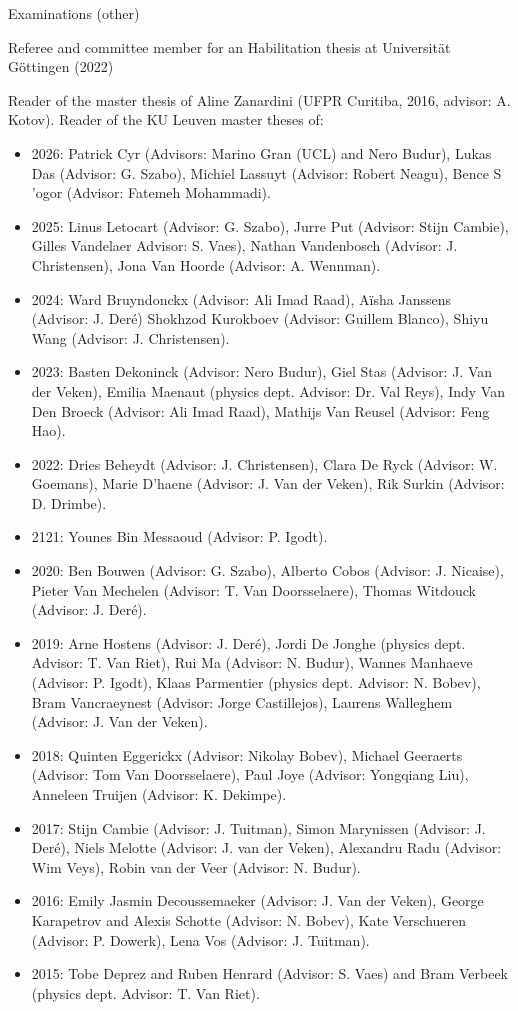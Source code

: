 \documentclass[12p]{resume}
\begin{document}
\begin{category}{Examinations (other)}

\citemnobullet Referee and committee member for an Habilitation thesis at Universit\"at G\"ottingen (2022) %

\citemnobullet Reader of the master thesis of Aline Zanardini (UFPR Curitiba, 2016, advisor: A. Kotov).
\citemnobullet Reader of the KU Leuven master theses of:
\begin{itemize}


\item 2026: Patrick Cyr (Advisors: Marino Gran (UCL) and Nero Budur),  Lukas Das (Advisor: G. Szabo), Michiel Lassuyt (Advisor: Robert Neagu), Bence S
'ogor (Advisor: Fatemeh Mohammadi).
\item 2025: Linus Letocart (Advisor: G. Szabo), Jurre Put (Advisor: Stijn Cambie), Gilles Vandelaer Advisor: S. Vaes), Nathan Vandenbosch (Advisor: J. Christensen), Jona Van Hoorde (Advisor: A. Wennman).
\item 2024: Ward Bruyndonckx (Advisor:  Ali Imad Raad), A\"isha Janssens (Advisor: J. Der\'e) Shokhzod Kurokboev (Advisor: Guillem Blanco), Shiyu Wang (Advisor: J. Christensen).
\item 2023: Basten Dekoninck (Advisor: Nero Budur), Giel Stas (Advisor: J. Van der Veken), Emilia Maenaut  (physics dept. Advisor: Dr. Val Reys), Indy Van Den Broeck (Advisor: Ali Imad Raad), Mathijs Van Reusel (Advisor: Feng Hao).
\item 2022: Dries Beheydt (Advisor: J. Christensen), Clara De Ryck (Advisor: W. Goemans), Marie D'haene (Advisor: J. Van der Veken), Rik Surkin (Advisor: D. Drimbe).
\item 2121: Younes Bin Messaoud (Advisor: P. Igodt).
\item 2020: Ben Bouwen (Advisor: G. Szabo),  Alberto Cobos (Advisor: J. Nicaise), Pieter Van Mechelen (Advisor: T. Van Doorsselaere), Thomas Witdouck (Advisor: J. Der\'e).
\item 2019: Arne Hostens (Advisor: J. Der\'e), 
 Jordi De Jonghe  (physics dept. Advisor: T. Van Riet),
Rui Ma (Advisor: N. Budur),
Wannes Manhaeve (Advisor: P. Igodt),
Klaas Parmentier (physics dept. Advisor: N. Bobev),
Bram Vancraeynest (Advisor: Jorge Castillejos), 
 Laurens Walleghem (Advisor: J. Van der Veken).
\item 2018:
Quinten Eggerickx (Advisor: Nikolay Bobev), 
Michael Geeraerts (Advisor: Tom Van Doorsselaere),
Paul Joye (Advisor: Yongqiang Liu), Anneleen Truijen (Advisor: K. Dekimpe).
\item 2017: Stijn Cambie (Advisor: J. Tuitman), Simon Marynissen (Advisor: J. Der\'e), Niels Melotte (Advisor: J. van der Veken), Alexandru Radu (Advisor: Wim Veys), Robin van der Veer (Advisor: N. Budur). 
\item   2016: Emily Jasmin Decoussemaeker (Advisor: J. Van der Veken), George Karapetrov and Alexis Schotte (Advisor: N. Bobev), Kate Verschueren (Advisor: P. Dowerk), Lena Vos (Advisor: J. Tuitman).
\item   2015: Tobe
Deprez and Ruben Henrard  (Advisor: S. Vaes) and
Bram Verbeek (physics dept. Advisor: T. Van Riet).
\end{itemize}



\end{category}
\end{document}
